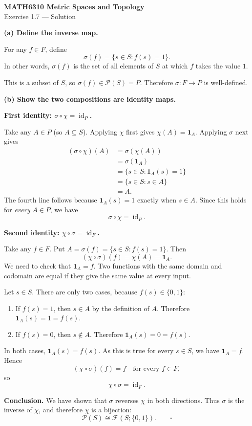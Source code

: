 \documentclass[11pt,a4paper]{article}
\begin{document}
\begin{center}
{\Large\bfseries MATH6310 Metric Spaces and Topology}\\[3pt]
{\large Exercise 1.7 --- Solution}
\end{center}

\textbf{(a) Define the inverse map.}

For any $f\in F$, define
\[
\boxed{\sigma(f)=\{s\in S:f(s)=1\}.}
\]
In other words, $\sigma(f)$ is the set of all elements of $S$ at which $f$ takes the value $1$.

This is a subset of $S$, so $\sigma(f)\in\mathcal P(S)=P$. Therefore $\sigma:F\to P$ is well-defined.

\textbf{(b) Show the two compositions are identity maps.}

\textbf{First identity: $\sigma\circ\chi=\operatorname{id}_P$.}

Take any $A\in P$ (so $A\subseteq S$). Applying $\chi$ first gives $\chi(A)=\mathbf 1_A$. Applying $\sigma$ next gives
\begin{align*}
(\sigma\circ\chi)(A)
  &=\sigma(\chi(A))\\
  &=\sigma(\mathbf 1_A)\\
  &=\{s\in S:\mathbf 1_A(s)=1\}\\
  &=\{s\in S:s\in A\}\\
  &=A.
\end{align*}
The fourth line follows because $\mathbf 1_A(s)=1$ exactly when $s\in A$.
Since this holds for \emph{every} $A\in P$, we have
\[
\boxed{\sigma\circ\chi=\operatorname{id}_P.}
\]

\textbf{Second identity: $\chi\circ\sigma=\operatorname{id}_F$.}

Take any $f\in F$. Put $A=\sigma(f)=\{s\in S:f(s)=1\}$.
Then
\[
(\chi\circ\sigma)(f)=\chi(A)=\mathbf 1_A.
\]
We need to check that $\mathbf 1_A=f$. Two functions with the same domain and codomain are equal if they give the same value at every input.

Let $s\in S$. There are only two cases, because $f(s)\in\{0,1\}$:
\begin{enumerate}[label=\textbf{Case \arabic*:},leftmargin=*,itemsep=1pt]
\item If $f(s)=1$, then $s\in A$ by the definition of $A$. Therefore $\mathbf 1_A(s)=1=f(s)$.
\item If $f(s)=0$, then $s\notin A$. Therefore $\mathbf 1_A(s)=0=f(s)$.
\end{enumerate}
In both cases, $\mathbf 1_A(s)=f(s)$. As this is true for every $s\in S$, we have $\mathbf 1_A=f$. Hence
\[
(\chi\circ\sigma)(f)=f
\quad\text{for every }f\in F,
\]
so
\[
\boxed{\chi\circ\sigma=\operatorname{id}_F.}
\]

\textbf{Conclusion.} We have shown that $\sigma$ reverses $\chi$ in both directions. Thus $\sigma$ is the inverse of $\chi$, and therefore $\chi$ is a bijection:
\[
\boxed{\mathcal P(S)\cong\mathcal F(S;\{0,1\}).}\qquad\square
\]
\end{document}
